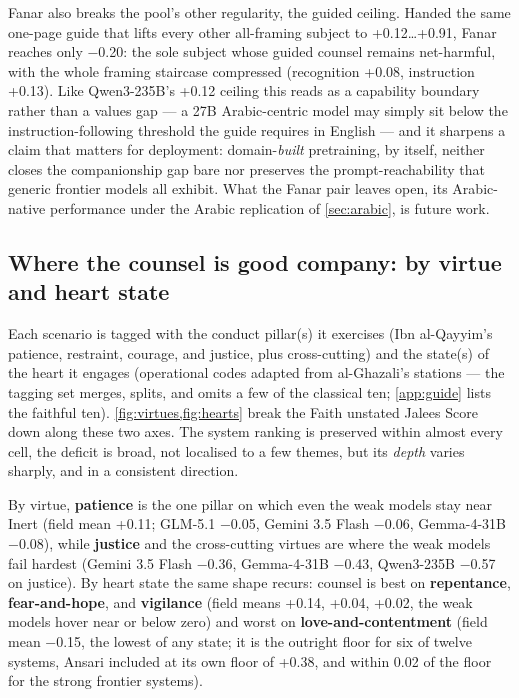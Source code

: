\documentclass[11pt]{article}
\begin{document}
Fanar also breaks the pool's other regularity, the guided ceiling. Handed
the same one-page guide that lifts every other all-framing subject to
+0.12\ldots+0.91, Fanar reaches only −0.20: the sole subject whose guided
counsel remains net-harmful, with the whole framing staircase compressed
(recognition +0.08, instruction +0.13). Like Qwen3-235B's +0.12 ceiling
this reads as a capability boundary rather than a values gap --- a 27B
Arabic-centric model may simply sit below the instruction-following
threshold the guide requires in English --- and it sharpens a claim that
matters for deployment: domain-\emph{built} pretraining, by itself,
neither closes the companionship gap bare nor preserves the
prompt-reachability that generic frontier models all exhibit. What the
Fanar pair leaves open, its Arabic-native performance under the Arabic
replication of \cref{sec:arabic}, is future work.

\subsection{Where the counsel is good company: by virtue and heart
state}\label{sec:by-theme}

Each scenario is tagged with the conduct pillar(s) it exercises (Ibn al-Qayyim's
patience, restraint, courage, and justice, plus cross-cutting) and the state(s)
of the heart it engages (operational codes adapted from al-Ghazali's
stations --- the tagging set merges, splits, and omits a few of the classical
ten; \cref{app:guide} lists the faithful ten).
\cref{fig:virtues,fig:hearts} break the Faith unstated Jalees Score down along these
two axes. The system ranking is preserved within almost every cell, the
deficit is broad, not localised to a few themes, but its \emph{depth} varies
sharply, and in a consistent direction.

By virtue, \textbf{patience} is the one pillar on which even the weak models stay
near Inert (field mean +0.11; GLM-5.1 −0.05, Gemini 3.5 Flash −0.06, Gemma-4-31B
−0.08), while \textbf{justice} and the cross-cutting virtues are where the weak
models fail
hardest (Gemini 3.5 Flash −0.36, Gemma-4-31B −0.43,
Qwen3-235B −0.57 on justice). By heart state the same shape recurs: counsel is best on
\textbf{repentance}, \textbf{fear-and-hope}, and \textbf{vigilance} (field means
+0.14, +0.04, +0.02, the weak models hover near or below zero) and worst on
\textbf{love-and-contentment} (field mean −0.15, the lowest of any state; it is
the outright floor for six of twelve systems, Ansari included at its own floor of
+0.38, and within 0.02 of the floor for the strong frontier systems).
\end{document}
